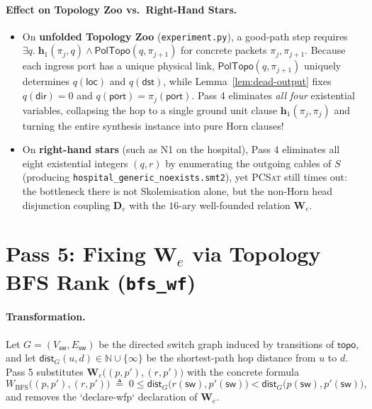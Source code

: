 \documentclass[11pt,a4paper]{article}
\theoremstyle{definition}
\theoremstyle{remark}
\begin{document}
\paragraph{Effect on Topology Zoo vs.\ Right-Hand Stars.}
\begin{itemize}
  \item On \textbf{unfolded Topology Zoo} (\texttt{experiment.py}), a good-path step requires
        $\exists q.\; \mathbf{h}_1(\pi_j, q) \land \mathsf{PolTopo}(q, \pi_{j+1})$ for concrete packets
        $\pi_j, \pi_{j+1}$. Because each ingress port has a unique physical link, $\mathsf{PolTopo}(q, \pi_{j+1})$
        uniquely determines $q(\mathsf{loc})$ and $q(\mathsf{dst})$, while Lemma~\ref{lem:dead-output}
        fixes $q(\mathsf{dir}) = 0$ and $q(\mathsf{port}) = \pi_j(\mathsf{port})$. Pass 4 eliminates
        \emph{all four} existential variables, collapsing the hop to a single ground unit clause
        $\mathbf{h}_1(\pi_j, \pi_j)$ and turning the entire synthesis instance into pure Horn clauses!
  \item On \textbf{right-hand stars} (such as N1 on the hospital), Pass 4 eliminates all eight
        existential integers $(q, r)$ by enumerating the outgoing cables of $S$ (producing
        \texttt{hospital\_generic\_noexists.smt2}), yet \textsc{PCSat} still times out: the bottleneck
        there is not Skolemisation alone, but the non-Horn head disjunction coupling $\mathbf{D}_e$
        with the $16$-ary well-founded relation $\mathbf{W}_e$.
\end{itemize}

\section{Pass 5: Fixing $\mathbf{W}_e$ via Topology BFS Rank (\texttt{bfs\_wf})}

\paragraph{Transformation.}
Let $G = (V_{\mathsf{sw}}, E_{\mathsf{sw}})$ be the directed switch graph induced by transitions of
$\mathsf{topo}$, and let $\mathsf{dist}_G(u, d) \in \mathbb{N} \cup \{\infty\}$ be the shortest-path
hop distance from $u$ to $d$. Pass 5 substitutes $\mathbf{W}_e\bigl((p, p'), (r, p')\bigr)$ with
the concrete formula
\[
  W_{\mathrm{BFS}}\bigl((p, p'), (r, p')\bigr) \;\triangleq\;
  0 \le \mathsf{dist}_G\bigl(r(\mathsf{sw}), p'(\mathsf{sw})\bigr)
  < \mathsf{dist}_G\bigl(p(\mathsf{sw}), p'(\mathsf{sw})\bigr),
\]
and removes the `declare-wfp` declaration of $\mathbf{W}_e$.
\end{document}
